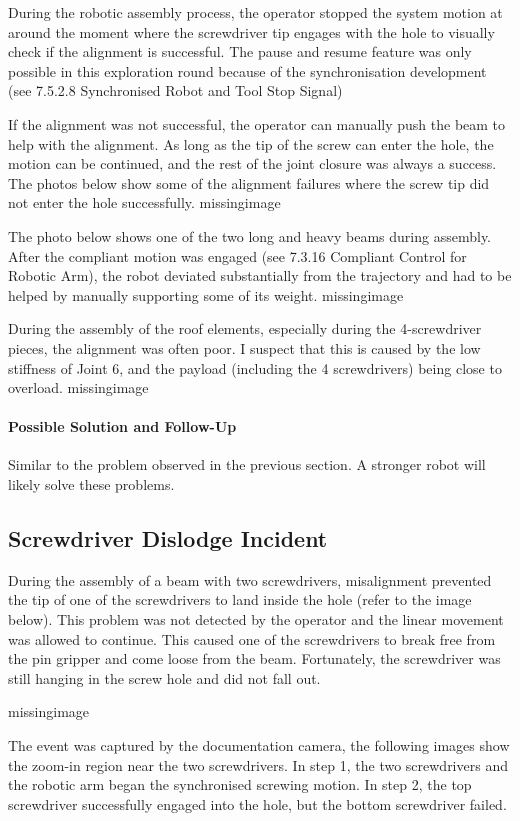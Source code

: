 During the robotic assembly process, the operator stopped the system motion at around the moment where the screwdriver tip engages with the hole to visually check if the alignment is successful. The pause and resume feature was only possible in this exploration round because of the synchronisation development (see 7.5.2.8 Synchronised Robot and Tool Stop Signal)

If the alignment was not successful, the operator can manually push the beam to help with the alignment. As long as the tip of the screw can enter the hole, the motion can be continued, and the rest of the joint closure was always a success. The photos below show some of the alignment failures where the screw tip did not enter the hole successfully. 
missingimage

The photo below shows one of the two long and heavy beams during assembly. After the compliant motion was engaged (see 7.3.16 Compliant Control for Robotic Arm), the robot deviated substantially from the trajectory and had to be helped by manually supporting some of its weight.
missingimage

During the assembly of the roof elements, especially during the 4-screwdriver pieces, the alignment was often poor. I suspect that this is caused by the low stiffness of Joint 6, and the payload (including the 4 screwdrivers) being close to overload. 
missingimage

\paragraph{Possible Solution and Follow-Up}
Similar to the problem observed in the previous section. A stronger robot will likely solve these problems.

\subsection{Screwdriver Dislodge Incident}
During the assembly of a beam with two screwdrivers, misalignment prevented the tip of one of the screwdrivers to land inside the hole (refer to the image below). This problem was not detected by the operator and the linear movement was allowed to continue. This caused one of the screwdrivers to break free from the pin gripper and come loose from the beam. Fortunately, the screwdriver was still hanging in the screw hole and did not fall out.

missingimage

The event was captured by the documentation camera, the following images show the zoom-in region near the two screwdrivers. In step 1, the two screwdrivers and the robotic arm began the synchronised screwing motion. In step 2, the top screwdriver successfully engaged into the hole, but the bottom screwdriver failed. 

